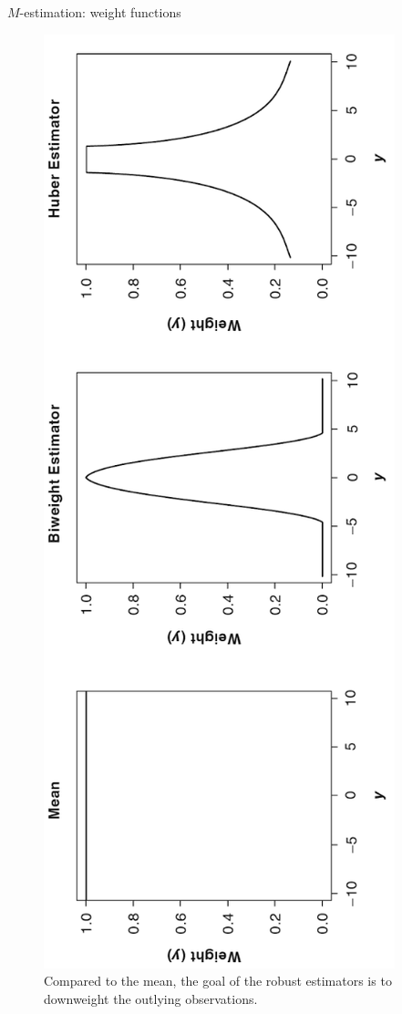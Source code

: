 \documentclass[12pt,english,pdf,xcolor=dvipsnames,aspectratio=169,handout]{beamer}\usepackage[]{graphicx}\usepackage[]{xcolor}
\begin{document}
\begin{frame}{$M$-estimation: weight functions}

\begin{figure}
\centering
\includegraphics[scale=0.6, angle=270]{../04-graphs/05-08}
\caption{Compared to the mean, the goal of the robust estimators is to downweight the outlying observations.}
\end{figure}

\end{frame}
\end{document}
